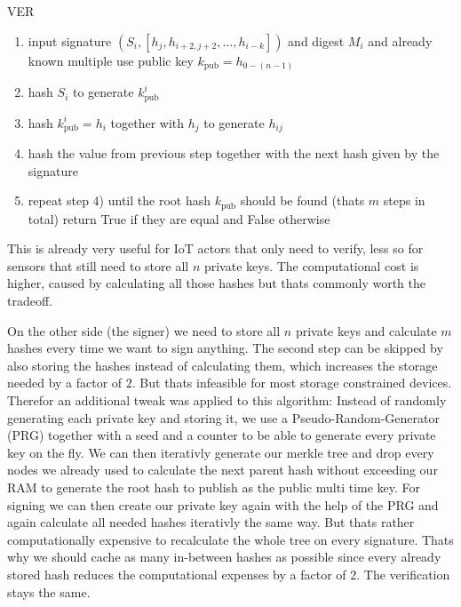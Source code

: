\documentclass[conference]{IEEEtran}
\begin{document}
\begin{algorithm}
    \caption{VER}\label{merkle ver v1}
        \begin{enumerate}
            \item input signature $(S_i,[h_{j},h_{i+2,j+2},\dots,h_{i-k}])$ and digest $M_i$ and already known multiple use public key $k_\text{pub}=h_{0-(n-1)}$
            \item hash $S_i$ to generate $k_\text{pub}^i$
            \item hash $k_\text{pub}^i=h_i$ together with $h_j$ to generate $h_{ij}$
            \item hash the value from previous step together with the next hash given by the signature
            \item repeat step 4) until the root hash $k_\text{pub}$ should be found (thats $m$ steps in total) return True if they are equal and False otherwise
        \end{enumerate}
    \end{algorithm}

This is already very useful for IoT actors that only need to verify, less so for sensors that still need to store all $n$ private keys. 
The computational cost is higher, caused by calculating all those hashes but thats commonly worth the tradeoff. 

On the other side (the signer) we need to store all $n$ private keys and calculate $m$ hashes every time we want to sign anything.
The second step can be skipped by also storing the hashes instead of calculating them, which increases the storage needed by a factor of $2$.
But thats infeasible for most storage constrained devices.
Therefor an additional tweak was applied to this algorithm:
Instead of randomly generating each private key and storing it, we use a Pseudo-Random-Generator (PRG) together with a seed and a counter to be able to generate every private key on the fly.
We can then iterativly generate our merkle tree and drop every nodes we already used to calculate the next parent hash without exceeding our RAM to generate the root hash to publish as the public multi time key.
For signing we can then create our private key again with the help of the PRG and again calculate all needed hashes iterativly the same way. 
But thats rather computationally expensive to recalculate the whole tree on every signature. 
Thats why we should cache as many in-between hashes as possible since every already stored hash reduces the computational expenses by a factor of 2.
The verification stays the same.
\end{document}
